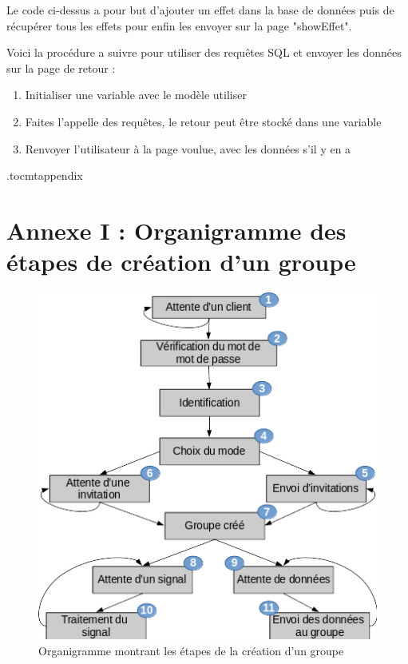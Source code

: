 \documentclass[a4paper, titlepage]{livret}
\begin{document}
	Le code ci-dessus a pour but d'ajouter un effet dans la base de données puis de récupérer tous les effets pour enfin les envoyer sur la page "showEffet".

	Voici la procédure a suivre pour utiliser des requêtes SQL et envoyer les données sur la page de retour :
	\begin{enumerate}
		\item Initialiser une variable avec le modèle utiliser
		\item Faites l'appelle des requêtes, le retour peut être stocké dans une variable
		\item Renvoyer l'utilisateur à la page voulue, avec les données s'il y en a
	\end{enumerate}
	

      
  \appendix
  \newpage
  
\etocdepthtag.toc{mtappendix}
\tableofcontents

  \chapter{Annexe I : Organigramme des étapes de création d'un groupe}
    \begin{figure}[th]
        \begin{center}
          \includegraphics[scale=0.9]{Assets/creationGroup.png}
          \caption{Organigramme montrant les étapes de la création d'un groupe}
          \label{organiGroupe}
        \end{center}
      \end{figure}
\end{document}
